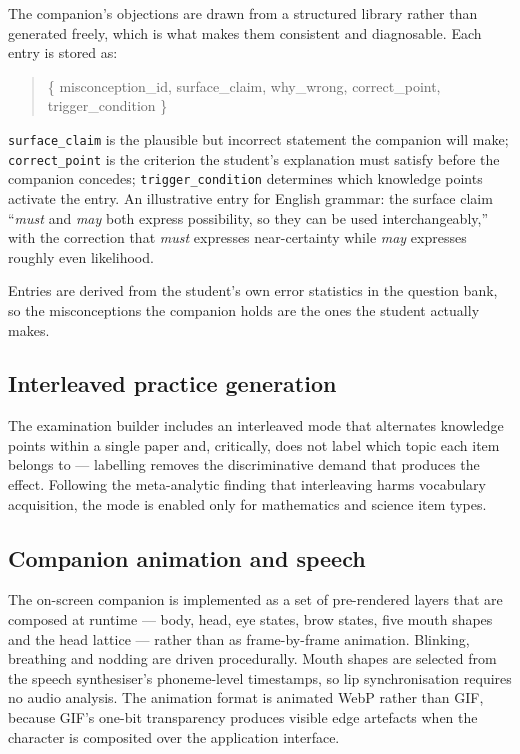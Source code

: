 \documentclass[11pt,a4paper]{article}
\begin{document}
The companion's objections are drawn from a structured library rather than generated freely,
which is what makes them consistent and diagnosable. Each entry is stored as:

\begin{quote}
\ttfamily\small
\{ misconception\_id, surface\_claim, why\_wrong, correct\_point, trigger\_condition \}
\end{quote}

\texttt{surface\_claim} is the plausible but incorrect statement the companion will make;
\texttt{correct\_point} is the criterion the student's explanation must satisfy before the
companion concedes; \texttt{trigger\_condition} determines which knowledge points activate
the entry. An illustrative entry for English grammar: the surface claim ``\emph{must} and
\emph{may} both express possibility, so they can be used interchangeably,'' with the
correction that \emph{must} expresses near-certainty while \emph{may} expresses roughly
even likelihood.

Entries are derived from the student's own error statistics in the question bank, so the
misconceptions the companion holds are the ones the student actually makes.

\subsection{Interleaved practice generation}

The examination builder includes an interleaved mode that alternates knowledge points within
a single paper and, critically, does not label which topic each item belongs to ---
labelling removes the discriminative demand that produces the effect. Following the
meta-analytic finding that interleaving harms vocabulary acquisition, the mode is enabled
only for mathematics and science item types.

\subsection{Companion animation and speech}

The on-screen companion is implemented as a set of pre-rendered layers that are composed at
runtime --- body, head, eye states, brow states, five mouth shapes and the head lattice ---
rather than as frame-by-frame animation. Blinking, breathing and nodding are driven
procedurally. Mouth shapes are selected from the speech synthesiser's phoneme-level
timestamps, so lip synchronisation requires no audio analysis. The animation format is
animated WebP rather than GIF, because GIF's one-bit transparency produces visible edge
artefacts when the character is composited over the application interface.
\end{document}
